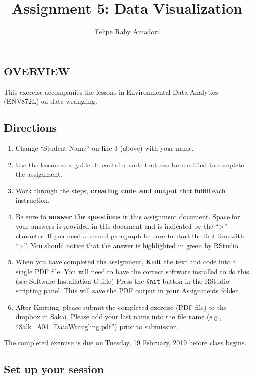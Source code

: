 \documentclass[]{article}
\title{Assignment 5: Data Visualization}
\author{Felipe Raby Amadori}
\date{}
\providecommand{\tightlist}{%
  \setlength{\itemsep}{0pt}\setlength{\parskip}{0pt}}
\begin{document}
\maketitle

\subsection{OVERVIEW}\label{overview}

This exercise accompanies the lessons in Environmental Data Analytics
(ENV872L) on data wrangling.

\subsection{Directions}\label{directions}

\begin{enumerate}
\def\labelenumi{\arabic{enumi}.}
\tightlist
\item
  Change ``Student Name'' on line 3 (above) with your name.
\item
  Use the lesson as a guide. It contains code that can be modified to
  complete the assignment.
\item
  Work through the steps, \textbf{creating code and output} that fulfill
  each instruction.
\item
  Be sure to \textbf{answer the questions} in this assignment document.
  Space for your answers is provided in this document and is indicated
  by the ``\textgreater{}'' character. If you need a second paragraph be
  sure to start the first line with ``\textgreater{}''. You should
  notice that the answer is highlighted in green by RStudio.
\item
  When you have completed the assignment, \textbf{Knit} the text and
  code into a single PDF file. You will need to have the correct
  software installed to do this (see Software Installation Guide) Press
  the \texttt{Knit} button in the RStudio scripting panel. This will
  save the PDF output in your Assignments folder.
\item
  After Knitting, please submit the completed exercise (PDF file) to the
  dropbox in Sakai. Please add your last name into the file name (e.g.,
  ``Salk\_A04\_DataWrangling.pdf'') prior to submission.
\end{enumerate}

The completed exercise is due on Tuesday, 19 February, 2019 before class
begins.

\subsection{Set up your session}\label{set-up-your-session}
\end{document}
